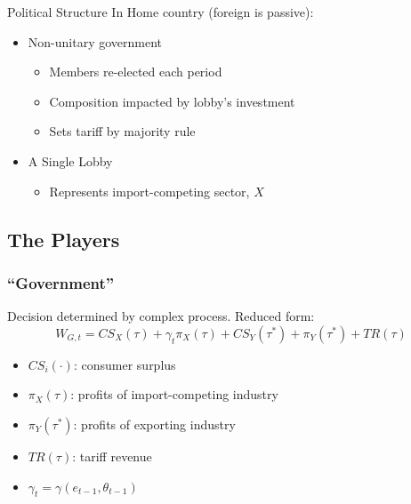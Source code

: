 \documentclass[handout]{beamer}
\newcommand{\ga}{\gamma}
\newcommand{\ta}{\theta}
\begin{document}
\begin{frame}{Political Structure}
In Home country (foreign is passive):
\pause
\begin{itemize}[<+->]
	\item Non-unitary government
		\begin{itemize}[<+->]
			\item Members re-elected each period
			\item Composition impacted by lobby's investment
			\item Sets tariff by majority rule
		\end{itemize}
	\item A Single Lobby
		\begin{itemize}
			\item Represents import-competing sector, $X$
		\end{itemize}	
\end{itemize}

\end{frame}


\subsection{The Players}
\begin{frame}
\frametitle{``Government''}
\pause
Decision determined by complex process. Reduced form:
\pause
\[
  W_{G,t} = \mathit{CS}_X(\tau) + \ga_t \pi_X(\tau) + \mathit{CS}_Y(\tau^*) + \pi_Y(\tau^*) + \mathit{TR}(\tau)
\]

\pause
\begin{itemize}[<+->]
	\item $\mathit{CS_i(\cdot)}$: consumer surplus
	\item $\pi_X(\tau)$: profits of import-competing industry
	\item $\pi_Y(\tau^*)$: profits of exporting industry
	\item $\mathit{TR}(\tau)$: tariff revenue
	\item $\ga_t = \ga(e_{t-1},\ta_{t-1})$
\end{itemize}
\end{frame}
\end{document}
